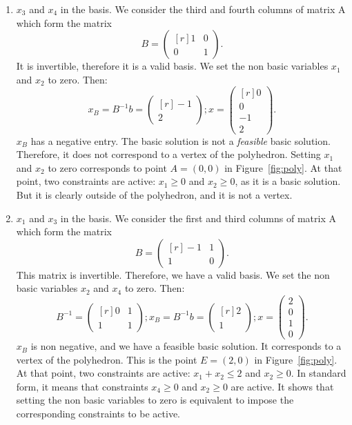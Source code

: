 \begin{enumerate}
\begin{enumerate}
\item $x_3$ and $x_4$ in the basis. We consider the third and fourth columns of matrix A which form the matrix $$B =
\begin{pmatrix*}[r]
1&0\\
0&1
\end{pmatrix*}.$$
It is invertible, therefore it is a valid basis. 
We set the non basic variables $x_1$ and $x_2$ to zero. Then: 
$$
x_B=B^{-1}b=
\begin{pmatrix*}[r]
-1\\
2
\end{pmatrix*};
x =
\begin{pmatrix*}[r]
0\\
0\\
-1\\
2
\end{pmatrix*}.$$
$x_B$ has a negative entry. The basic solution is not a \emph{feasible}
basic solution. Therefore, it does not correspond to a vertex of the
polyhedron. Setting $x_1$ and $x_2$ to zero corresponds to point $A=(0,0)$
in Figure~\ref{fig:poly}. At that point, two constraints are active: $x_1 \geq 0$
and $x_2 \geq 0$, as it is a basic solution. But it is clearly outside
of the polyhedron, and it is not a vertex.

\item $x_1$ and $x_3$ in the basis. We consider the first and third columns of matrix A which form the matrix $$B =
\begin{pmatrix*}[r]
-1&1\\
1&0
\end{pmatrix*}.$$
This matrix is invertible. Therefore, we have a valid basis. 
We set the non basic variables $x_2$ and $x_4$ to zero. Then: 
$$B^{-1} =
\begin{pmatrix*}[r]
0&1\\
1&1
\end{pmatrix*}
;
x_B=B^{-1}b=
\begin{pmatrix*}[r]
2\\
1
\end{pmatrix*}
;
x
=
\begin{pmatrix}
2\\
0\\
1\\
0
\end{pmatrix}.
$$
$x_B$ is non negative, and we have a feasible basic solution. It
corresponds to a vertex of the polyhedron. This is the point $E=(2,0)$
in Figure~\ref{fig:poly}. At that point, two constraints are active: $x_1+x_2
\leq 2$
and $x_2 \geq 0$. In standard form, it means that constraints $x_4
\geq 0$ and $x_2 \geq 0$ are active. It shows that setting the non
basic variables to zero is equivalent to impose the corresponding
constraints to be active. 


\end{enumerate}
\end{enumerate}
